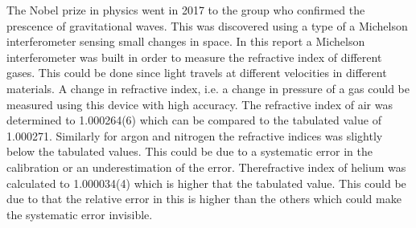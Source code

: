 The Nobel prize in physics went in 2017 to the group who confirmed the prescence of gravitational waves. This was discovered using a type of a Michelson interferometer sensing small changes in space. In this report a Michelson interferometer was built in order to measure the refractive index of different gases. This could be done since light travels at different velocities in different materials. A change in refractive index, i.e. a change in pressure of a gas could be measured using this device with high accuracy. The refractive index of air was determined to 1.000264(6) which can be compared to the tabulated value of 1.000271. Similarly for argon and nitrogen the refractive indices was slightly below the tabulated values. This could be due to a systematic error in the calibration or an underestimation of the error. Therefractive index of helium was calculated to 1.000034(4) which is higher that the tabulated value. This could be due to that the relative error in this is higher than the others which could make the systematic error invisible.
